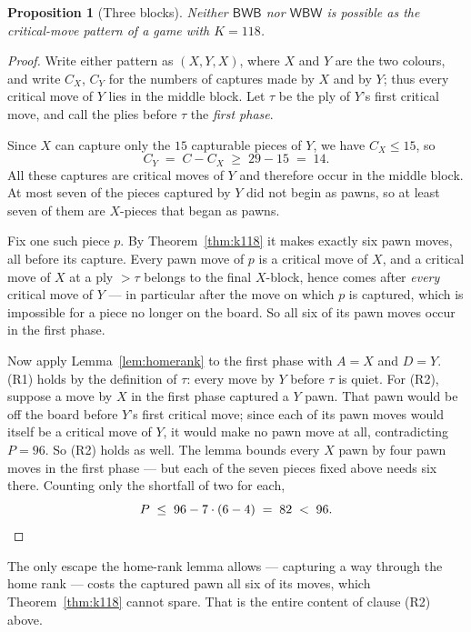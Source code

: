 \documentclass[11pt]{article}
\newtheorem{proposition}[theorem]{Proposition}
\theoremstyle{definition}
\theoremstyle{remark}
\theoremstyle{plain}
\begin{document}
\begin{proposition}[Three blocks]\label{prop:threeblocks}
Neither $\mathsf{BWB}$ nor $\mathsf{WBW}$ is possible as the
critical-move pattern of a game with $K = 118$.
\end{proposition}

\begin{proof}
Write either pattern as $(X, Y, X)$, where $X$ and $Y$ are the two
colours, and write $C_X$, $C_Y$ for the numbers of captures made by $X$
and by $Y$; thus every critical move of $Y$ lies in the middle block.
Let $\tau$ be the ply of $Y$'s first critical move, and call the plies
before $\tau$ the \emph{first phase}.

Since $X$ can capture only the $15$ capturable pieces of $Y$, we have
$C_X \le 15$, so
\[
  C_Y \;=\; C - C_X \;\ge\; 29 - 15 \;=\; 14 .
\]
All these captures are critical moves of $Y$ and therefore occur in the
middle block. At most seven of the pieces captured by $Y$ did not begin
as pawns, so at least seven of them are $X$-pieces that began as pawns.

Fix one such piece $p$. By Theorem~\ref{thm:k118} it makes exactly six
pawn moves, all before its capture. Every pawn move of $p$ is a critical
move of $X$, and a critical move of $X$ at a ply $> \tau$ belongs to the
final $X$-block, hence comes after \emph{every} critical move of $Y$ ---
in particular after the move on which $p$ is captured, which is
impossible for a piece no longer on the board. So all six of its pawn
moves occur in the first phase.

Now apply Lemma~\ref{lem:homerank} to the first phase with $A = X$ and
$D = Y$. (R1) holds by the definition of $\tau$: every move by $Y$
before $\tau$ is quiet. For (R2), suppose a move by $X$ in the first
phase captured a $Y$ pawn. That pawn would be off the board before
$Y$'s first critical move; since each of its pawn moves would itself be
a critical move of $Y$, it would make no pawn move at all,
contradicting $P = 96$. So (R2) holds as well. The lemma bounds every
$X$ pawn by four pawn moves in the first phase --- but each of the
seven pieces fixed above needs six there. Counting only the shortfall
of two for each,
\[
  P \;\le\; 96 - 7 \cdot (6 - 4) \;=\; 82 \;<\; 96. \qedhere
\]
\end{proof}

The only escape the home-rank lemma allows --- capturing a way through the
home rank --- costs the captured pawn all six of its moves, which
Theorem~\ref{thm:k118} cannot spare. That is the entire content of clause
(R2) above.
\end{document}
